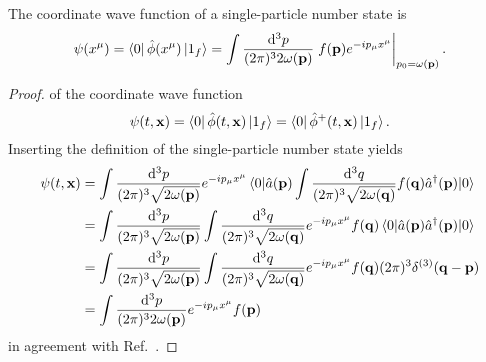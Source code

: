\begin{lemma}\label{thm:qkg_number_state_single_wave_function}
	The coordinate wave function of a single-particle number state is
	\begin{equation}
		\psi(x^\mu)
		=
		\bra{0}
		\hat\phi(x^\mu)
		\ket{1_f}
		=
		\int\frac{\dd[3]{p}}{(2\pi)^32\omega(\vb{p})}
		\eval{
			f(\vb{p})
			e^{-ip_\mu x^\mu}
		}_{p_0=\omega(\vb{p})}
		.
	\end{equation}
\end{lemma}
\begin{proof}
	of the coordinate wave function
	\begin{equation*}
		\psi(t,\vb{x})
		=
		\bra{0}
		\hat\phi(t,\vb{x})
		\ket{1_f}
		=
		\bra{0}
		\hat\phi^+(t,\vb{x})
		\ket{1_f}
		.
	\end{equation*}
	Inserting the definition of the single-particle number state yields
	\begin{equation*}
		\begin{split}
			\psi(t,\vb{x})
			&=
			\int\frac{\dd[3]{p}}{(2\pi)^3\sqrt{2\omega(\vb{p})}}
			e^{-ip_\mu x^\mu}
			\expval{
				\hat{a}(\vb{p})
				\int\frac{\dd[3]{q}}{(2\pi)^3\sqrt{2\omega(\vb{q})}}
				f(\vb{q})
				\hat{a}^\dagger(\vb{p})
			}{0}
			\\
			&=
			\int\frac{\dd[3]{p}}{(2\pi)^3\sqrt{2\omega(\vb{p})}}
			\int\frac{\dd[3]{q}}{(2\pi)^3\sqrt{2\omega(\vb{q})}}
			e^{-ip_\mu x^\mu}
			f(\vb{q})
			\expval{
				\hat{a}(\vb{p})
				\hat{a}^\dagger(\vb{p})
			}{0}
			\\
			&=
			\int\frac{\dd[3]{p}}{(2\pi)^3\sqrt{2\omega(\vb{p})}}
			\int\frac{\dd[3]{q}}{(2\pi)^3\sqrt{2\omega(\vb{q})}}
			e^{-ip_\mu x^\mu}
			f(\vb{q})
			(2\pi)^3
			\delta^{(3)}(\vb{q}-\vb{p})
			\\
			&=
			\int\frac{\dd[3]{p}}{(2\pi)^32\omega(\vb{p})}
			e^{-ip_\mu x^\mu}
			f(\vb{p})
		\end{split}
	\end{equation*}
	in agreement with Ref.~\cite[eq.~4]{Naumov2013}.
\end{proof}

